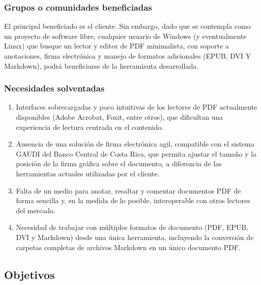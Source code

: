 \subsubsection{Grupos o comunidades beneficiadas}

El principal beneficiado es el cliente. Sin embargo, dado que se contempla como un proyecto de software libre, cualquier usuario de Windows (y eventualmente Linux) que busque un lector y editor de PDF minimalista, con soporte a anotaciones, firma electrónica y manejo de formatos adicionales (EPUB, DVI Y Markdown), podrá beneficiarse de la herramienta desarrollada.

\subsubsection{Necesidades solventadas}

\begin{enumerate}
	\item Interfaces sobrecargadas y poco intuitivas de los lectores de PDF actualmente disponibles (Adobe Acrobat, Foxit, entre otros), que dificultan una experiencia de lectura centrada en el contenido.
	\item Ausencia de una solución de firma electrónica agil, compatible con el sistema GAUDI del Banco Central de Costa Rica, que permita ajustar el tamaño y la posición de la firma gráfica sobre el documento, a diferencia de las herramientas actuales utilizadas por el cliente.
	\item Falta de un medio para anotar, resaltar y comentar documentos PDF de forma sencilla y, en la medida de lo posible, interoperable con otros lectores del mercado.
	\item Necesidad de trabajar con múltiples formatos de documento (PDF, EPUB, DVI y Markdown) desde una única herramienta, incluyendo la conversión de carpetas completas de archivos Markdown en un único documento PDF.
\end{enumerate}

\subsection{Objetivos}

%


